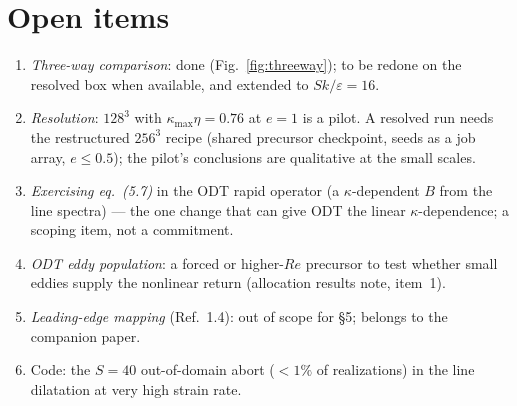 \documentclass[11pt,a4paper]{article}
\newcommand{\Ske}{Sk/\varepsilon}
\begin{document}
\section{Open items}

\begin{enumerate}[leftmargin=2em,itemsep=2pt]
\item \emph{Three-way comparison}: done (Fig.~\ref{fig:threeway}); to be
  redone on the resolved box when available, and extended to $\Ske=16$.
\item \emph{Resolution}: $128^3$ with $\kappa_{\max}\eta=0.76$ at $e=1$ is
  a pilot. A resolved run needs the restructured $256^3$ recipe (shared
  precursor checkpoint, seeds as a job array, $e\le0.5$); the pilot's
  conclusions are qualitative at the small scales.
\item \emph{Exercising eq.\ (5.7)} in the ODT rapid operator (a
  $\kappa$-dependent $B$ from the line spectra) --- the one change that
  can give ODT the linear $\kappa$-dependence; a scoping item, not a
  commitment.
\item \emph{ODT eddy population}: a forced or higher-$Re$ precursor to
  test whether small eddies supply the nonlinear return (allocation
  results note, item~1).
\item \emph{Leading-edge mapping} (Ref.~1.4): out of scope for \S5;
  belongs to the companion paper.
\item Code: the $S=40$ out-of-domain abort ($<1\%$ of realizations) in the
  line dilatation at very high strain rate.
\end{enumerate}
\end{document}
